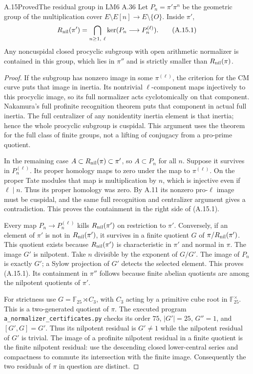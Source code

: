 \begin{statement}{A.15}{Proved}{The residual group in LM6 A.36}
Let $P_n=\pi'\pi^n$ be the geometric group of the multiplication
cover $E\setminus E[n]\to E\setminus\{O\}$. Inside $\pi'$,
\[
 R_{\rm nil}(\pi')
  =\bigcap_{n\ge1,\ \ell}\ker(P_n\longrightarrow P_n^{(\ell)}).
                                                               \tag{A.15.1}
\]
Any noncuspidal closed procyclic subgroup with open arithmetic
normalizer is contained in this group, which lies in $\pi''$
and is strictly smaller than $R_{\rm nil}(\pi)$.
\end{statement}
\begin{proof}
If the subgroup has nonzero image in some $\pi^{(\ell)}$, the
criterion for the CM curve puts that image in inertia. Its
nontrivial $\ell$-component maps injectively to this procyclic
image, so its full normalizer acts cyclotomically on that
component. Nakamura's full profinite recognition theorem
\cite[Theorem 2.1.1]{Nakamura1994} puts that component in actual
full inertia. The full centralizer of any nonidentity inertia
element is that inertia; hence the whole procyclic subgroup is
cuspidal. This argument uses the theorem for the full class of
finite groups, not a lifting of conjugacy from a pro-prime quotient.

In the remaining case $A\subset R_{\rm nil}(\pi)\subset\pi'$,
so $A\subset P_n$ for all $n$. Suppose it survives in
$P_n^{(\ell)}$. Its proper homology maps to zero under the map
to $\pi^{(\ell)}$. On the proper Tate modules that map is
multiplication by $n$, which is injective even if $\ell\mid n$.
Thus its proper homology was zero. By A.11 its nonzero pro-$\ell$
image must be cuspidal, and the same full recognition and
centralizer argument gives a contradiction. This proves the
containment in the right side of (A.15.1).

Every map $P_n\to P_n^{(\ell)}$ kills $R_{\rm nil}(\pi')$ on
restriction to $\pi'$. Conversely, if an element of $\pi'$ is
not in $R_{\rm nil}(\pi')$, it survives in a finite quotient
$G$ of $\pi/R_{\rm nil}(\pi')$. This quotient exists because
$R_{\rm nil}(\pi')$ is characteristic in $\pi'$ and normal in
$\pi$. The image $G'$ is nilpotent. Take $n$ divisible by the
exponent of $G/G'$. The image of $P_n$ is exactly $G'$; a Sylow
projection of $G'$ detects the selected element. This proves
(A.15.1). Its containment in $\pi''$ follows because finite
abelian quotients are among the nilpotent quotients of $\pi'$.

For strictness use $G=\mathbb F_{25}\rtimes C_3$, with $C_3$
acting by a primitive cube root in $\mathbb F_{25}^{\times}$.
This is a two-generated quotient of $\pi$.
The executed program \texttt{a\_normalizer\_certificates.py}
checks its order $75$, $|G'|=25$, $G''=1$, and
$[G',G]=G'$. Thus its nilpotent residual is $G'\ne1$ while the
nilpotent residual of $G'$ is trivial. The image of a profinite
nilpotent residual in a finite quotient is the finite nilpotent
residual: use the descending closed lower-central series and
compactness to commute its intersection with the finite image.
Consequently the two residuals of $\pi$ in question are distinct.
\end{proof}

